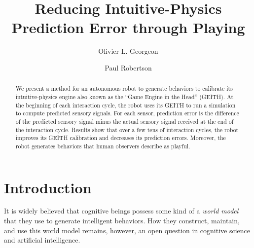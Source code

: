 \documentclass[runningheads]{llncs}
\begin{document}
%
\title{Reducing Intuitive-Physics Prediction Error through Playing}
%
%
\author{Olivier L. Georgeon \and
Paul Robertson }
%
%
%
\maketitle              %
%
\begin{abstract}
We present a method for an autonomous robot to generate behaviors to calibrate its intuitive-physics engine also known as the ``Game Engine in the Head'' (GEITH).
At the beginning of each interaction cycle, the robot uses its GEITH to run a simulation to compute predicted sensory signals. 
For each sensor, prediction error is the difference of the predicted sensory signal minus the actual sensory signal received at the end of the interaction cycle. 
Results show that over a few tens of interaction cycles, the robot improves its GEITH calibration and decreases its prediction errors. 
Moreover, the robot generates behaviors that human observers describe as playful.

\end{abstract}
%
%
%
\section{Introduction}

It is widely believed that cognitive beings possess some kind of a \textit{world model} that they use to generate intelligent behaviors.
How they construct, maintain, and use this world model remains, however,  an open question in cognitive science and artificial intelligence. 
\end{document}

